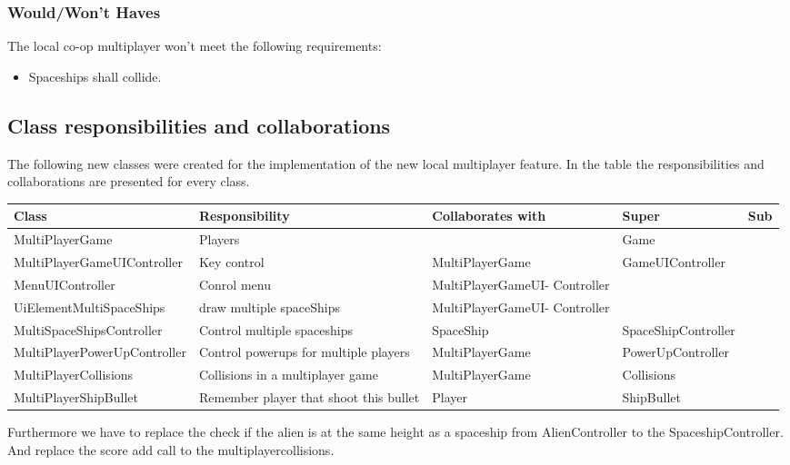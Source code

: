 \documentclass[10pt]{article}
\begin{document}
\subsubsection{Would/Won't Haves}
The local co-op multiplayer won't meet the following requirements:
\begin{itemize}
	\item Spaceships shall collide.
\end{itemize}
\newpage

\subsection{Class responsibilities and collaborations}


The following new classes were created for the implementation of the new local multiplayer feature.
In the table the responsibilities and collaborations are presented for every class.
\begin{center}
    \begin{tabular}{ | p{4.5cm} | p{3cm} | p{3cm} | p{3cm} | p{1cm} |}
  \hline
    Class & Responsibility & Collaborates with & Super & Sub \\ \hline
   MultiPlayerGame & Players  & & Game & \\ \hline
   MultiPlayerGameUIController & Key control & MultiPlayerGame  & GameUIController  & \\ \hline
   MenuUIController& Conrol menu & MultiPlayerGameUI- Controller  &   &  \\ \hline
   UiElementMultiSpaceShips& draw multiple spaceShips & MultiPlayerGameUI- Controller  &  &  \\ \hline
 MultiSpaceShipsController& Control multiple spaceships & SpaceShip  & SpaceShipController &  \\ \hline
 MultiPlayerPowerUpController& Control powerups for multiple players & MultiPlayerGame   & PowerUpController &  \\ \hline
 MultiPlayerCollisions & Collisions in a multiplayer game & MultiPlayerGame   & Collisions&  \\ \hline
 MultiPlayerShipBullet & Remember player that shoot this bullet & Player  & ShipBullet &  \\ \hline

    \end{tabular}
\end{center}

Furthermore we have to replace the check if the alien is at the same height as a spaceship from AlienController to the SpaceshipController. \newline
And replace the score add call to the multiplayercollisions.
\end{document}
